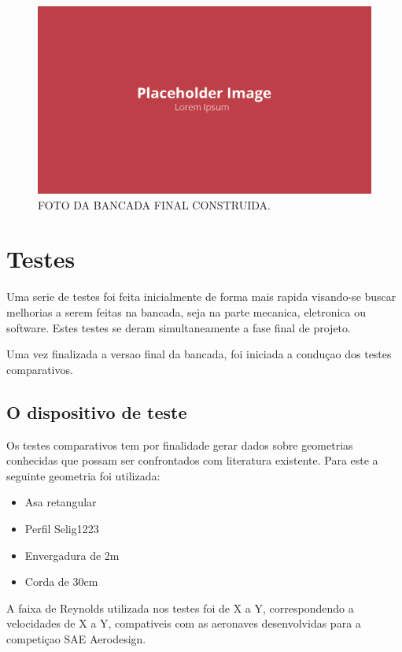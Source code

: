 \begin{figure}[!ht]
    \centering
    \includegraphics[width=.8\linewidth]{figuras/placeholder.png}
    \caption{FOTO DA BANCADA FINAL CONSTRUIDA\cite{autor}.}
    \label{fig:placeholder}
\end{figure}

\section{Testes}

Uma serie de testes foi feita inicialmente de forma mais rapida visando-se buscar melhorias a serem feitas na bancada, seja na parte mecanica, eletronica ou software. Estes testes se deram simultaneamente a fase final de projeto.

Uma vez finalizada a versao final da bancada, foi iniciada a conduçao dos testes comparativos.

\subsection{O dispositivo de teste}

Os testes comparativos tem por finalidade gerar dados sobre geometrias conhecidas que possam ser confrontados com literatura existente. Para este a seguinte geometria foi utilizada:

\begin{itemize}
    \item Asa retangular
    \item Perfil Selig1223
    \item Envergadura de 2m
    \item Corda de 30cm
\end{itemize}

A faixa de Reynolds utilizada nos testes foi de X a Y, correspondendo a velocidades de X a Y, compativeis com as aeronaves desenvolvidas para a competiçao SAE Aerodesign.

